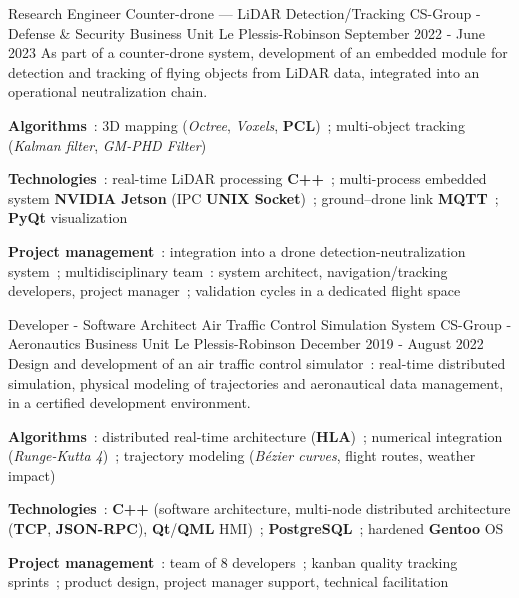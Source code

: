 \begin{cventries}
	\cventry
	{Research Engineer}
	{Counter-drone --- LiDAR Detection\slash Tracking}
	{CS-Group - Defense \& Security Business Unit} %
	{Le Plessis-Robinson} %
	{September 2022 - June 2023} %
	{As part of a counter-drone system, development of an embedded module for detection and tracking of flying objects from LiDAR data, integrated into an operational neutralization chain.} %
	{
		\begin{cvitems}
			\item{\textbf{Algorithms}~: 3D mapping (\textit{Octree}, \textit{Voxels}, \textbf{PCL})~; multi-object tracking (\textit{Kalman filter}, \textit{GM-PHD Filter})}
			\item{\textbf{Technologies}~: real-time LiDAR processing \textbf{C++}~; multi-process embedded system \textbf{NVIDIA Jetson} (IPC \textbf{UNIX Socket})~; ground--drone link \textbf{MQTT}~; \textbf{PyQt} visualization}
			\item{\textbf{Project management}~: integration into a drone detection-neutralization system~; multidisciplinary team~: system architect, navigation\slash tracking developers, project manager~; validation cycles in a dedicated flight space}
		\end{cvitems}
	}

	\cventry
	{Developer - Software Architect}
	{Air Traffic Control Simulation System}
	{CS-Group - Aeronautics Business Unit} %
	{Le Plessis-Robinson} %
	{December 2019 - August 2022} %
	{Design and development of an air traffic control simulator~: real-time distributed simulation, physical modeling of trajectories and aeronautical data management, in a certified development environment.} %
	{
		\begin{cvitems}
			\item{\textbf{Algorithms}~: distributed real-time architecture (\textbf{HLA})~; numerical integration (\textit{Runge-Kutta 4})~; trajectory modeling (\textit{Bézier curves}, flight routes, weather impact)}
			\item{\textbf{Technologies}~: \textbf{C++} (software architecture, multi-node distributed architecture (\textbf{TCP}, \textbf{JSON-RPC}), \textbf{Qt}\slash\textbf{QML} HMI)~; \textbf{PostgreSQL}~; hardened \textbf{Gentoo} OS}
			\item{\textbf{Project management}~: team of 8 developers~; kanban quality tracking sprints~; product design, project manager support, technical facilitation}
		\end{cvitems}
	}


\end{cventries}

